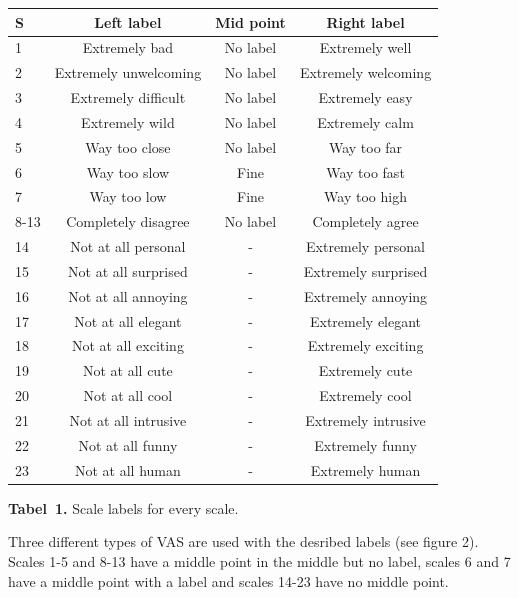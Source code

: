 \documentclass[paperwidth=160cm,paperheight=100cm,landscape,fontscale=0.3010]{baposter}
\begin{document}
\begin{poster}
{\begin{center}
		\begin{tabular}{l|c|c|c}
		S     & Left label & Mid point & Right label \\\hline
		1   & Extremely bad  & No label & Extremely well        \\\hline
		2   & Extremely unwelcoming & No label & Extremely welcoming          \\\hline
		3   & Extremely difficult & No label & Extremely easy         \\\hline
		4   & Extremely wild & No label & Extremely calm \\\hline
		5   & Way too close  & No label & Way too far        \\\hline
		6   & Way too slow & Fine & Way too fast         \\\hline
		7   & Way too low & Fine & Way too high \\\hline
		8-13   & Completely disagree  & No label & Completely agree   \\\hline
		14   & Not at all personal & - & Extremely personal        \\\hline
		15   & Not at all surprised & - & Extremely surprised      \\\hline
		16   & Not at all annoying  & - & Extremely annoying        \\\hline
		17   & Not at all elegant  & - & Extremely elegant         \\\hline
		18   & Not at all exciting & - & Extremely exciting          \\\hline
		19   & Not at all cute & - & Extremely cute          \\\hline                        
		20   & Not at all cool  & - & Extremely cool         \\\hline
		21   & Not at all intrusive & - & Extremely intrusive         \\\hline
		22   & Not at all funny & - & Extremely funny          \\\hline
		23   & Not at all human & - & Extremely human
	\end{tabular}        
\textbf{Tabel~1. }Scale labels for every scale.
\end{center}
\vspace{-15pt}
Three different types of VAS are used with the desribed labels (see figure 2). Scales 1-5 and 8-13 have a middle point in the middle but no label, scales 6 and 7 have a middle point with a label and scales 14-23 have no middle point.
\begin{center}

\end{center}}
\end{poster}
\end{document}
